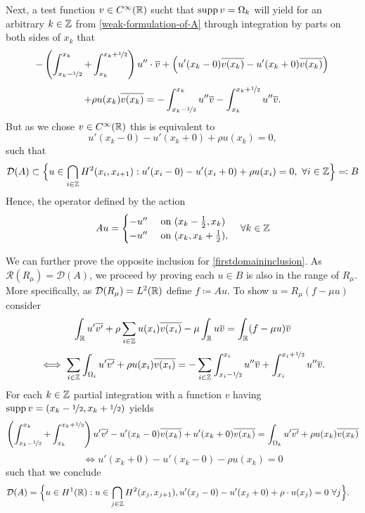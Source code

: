 Next, a test function $v \in C^{\infty}(\mathbb{R})$ sucht that $\operatorname{supp} v = \Omega_{k}$ will yield for an arbitrary $k \in \mathbb{Z}$ from \eqref{weak-formulation-of-A}   through integration by parts on both sides of $x_{k}$ that
	\[ -\left( \int_{x_{k}-\nicefrac{1}{2}}^{x_{k}} + \int_{x_{k}}^{x_{k} + \nicefrac{1}{2}}\right) u'' \cdot \overline{v} + \left( u'(x_{k}-0) \overline{v(x_{k})} - u'(x_{k} + 0) \overline{v(x_{k})} \right) \\ \]
	\[ +  \rho u(x_{k})\overline{v(x_{k})} = - \int_{x_{k} - \nicefrac{1}{2}}^{x_{k}} u'' \overline{v} - \int_{x_{k}}^{x_{k} + \nicefrac{1}{2}} u'' \overline{v}. \]
But as we chose $v \in C^{\infty}(\mathbb{R})$ this is equivalent to
	\[ u'(x_{k}-0) - u'(x_{k}+0) + \rho u(x_{k}) = 0, \]
such that
	\begin{equation}
		\mathcal{D}(A) \subset \Big\{ u \in \bigcap_{i \in \mathbb{Z}} H^{2}(x_{i}, x_{i + 1}) : u'(x_{i} - 0) - u'(x_{i} + 0) + \rho u(x_{i}) = 0 , ~\forall i \in \mathbb{Z} \Big\} \eqqcolon B \label{firstdomaininclusion}
	\end{equation} 
Hence, the operator defined by the action
	\[ A u = \begin{cases}
					- u'' & \text{ on } (x_{k} - \frac{1}{2}, x_{k}) \\
					- u'' & \text{ on } (x_{k}, x_{k} + \frac{1}{2}),
			 \end{cases} \quad \forall k \in \mathbb{Z} \] %
				
We can further prove the opposite inclusion for \eqref{firstdomaininclusion}. As $\mathcal{R}(R_{\mu}) = \mathcal{D}(A)$, we proceed by proving each $u \in B$ is also in the range of $R_{\mu}$. More specifically, as $\mathcal{D}(R_{\mu}) = L^{2}(\mathbb{R})$ define $f \coloneqq A u$. To show $u = R_{\mu}(f - \mu u)$ consider
	\[ \int_{\mathbb{R}} u' \overline{v'} + \rho \sum_{i \in \mathbb{Z}} u(x_{i}) \overline{v(x_{i})} - \mu \int_{\mathbb{R}} u \overline{v}= \int_{\mathbb{R}}(f-\mu u) \overline{v} \]
	\[ \iff \sum_{i \in \mathbb{Z}} \int_{\Omega_{i}} u' \overline{v'} + \rho u(x_{i}) \overline{v(x_{i})} = - \sum_{i \in \mathbb{Z}} \int_{x_{i} - \nicefrac{1}{2}}^{x_{i}} u'' \overline{v} + \int_{x_{i}}^{x_{i} + \nicefrac{1}{2}} u'' \overline{v}. \]
	For each $k \in \mathbb{Z}$ partial integration with a function $v$ having $\operatorname{supp} v = (x_{k} - \nicefrac{1}{2}, x_{k} + \nicefrac{1}{2})$ yields
	\[ \left( \int_{x_{k} - \nicefrac{1}{2}}^{x_{k}} + \int_{x_{k}}^{x_{k} +\nicefrac{1}{2}} \right) u' \overline{v'} - u'(x_{k}-0) \overline{v(x_{k})}  + u'(x_{k}+0) \overline{v(x_{k})}  = \int_{\Omega_{k}} u' \overline{v'} + \rho u(x_{k}) \overline{v(x_{k})} \]
	\[ \iff u'(x_{k}+0) - u'(x_{k}-0) - \rho u(x_{k}) = 0 \]
	such that we conclude
	\begin{align*}
		\mathcal{D}(A) & = \Big\{ u \in H^{1}(\mathbb{R}): u \in \bigcap_{j \in \mathbb{Z}} H^{2}(x_{j} , x_{j+1}), u'(x_{j} - 0) - u'(x_{j} + 0) + \rho \cdot u(x_{j}) = 0 ~\forall j \Big\}.
	\end{align*}

